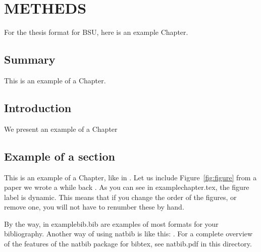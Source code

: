 \chapter{METHEDS}
\label{chap:methods}

For the thesis format for BSU, here is an example Chapter.

\section{Summary}
 
This is an example of a Chapter. 

\section{Introduction}

We present an example of a Chapter

\section{\nobreak Example of a section}

This is an example of a Chapter, like in \citet{Krauth2021}. Let us
include Figure~\ref{fig:figure} from a paper we wrote a while back
\citep{Wang2004a}. As you can see in examplechapter.tex, the
figure label is dynamic. This means that if you change the order of
the figures, or remove one, you will not have to renumber these by
hand.

By the way, in examplebib.bib are examples of most formats for your
bibliography. Another way of using natbib is like this: \cite[or][for
example]{mythesis}. For a complete overview of the features of the
natbib package for bibtex, see natbib.pdf in this directory.

